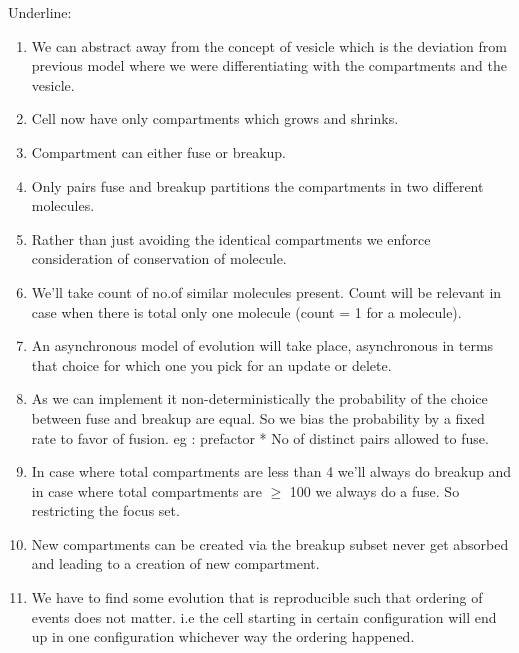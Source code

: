 \documentclass[preprint,12pt]{elsarticle}
\begin{document}
Underline:
\begin{enumerate}
\item We can abstract away from the concept of vesicle which is the  deviation from previous model where we were differentiating with the compartments and the vesicle.
\item Cell now have only compartments which grows and shrinks. 
\item Compartment can either fuse or breakup.
\item Only pairs fuse and breakup partitions the compartments in two different molecules.
\item Rather than just avoiding the identical compartments we enforce consideration of conservation of molecule.
\item We'll take count of no.of similar molecules present. Count will be relevant in case when there is total only one molecule (count = 1 for a molecule).
\item An asynchronous model of evolution will take place, asynchronous in terms that choice for which one you pick for an update or delete.
\item As we can implement it non-deterministically the probability of the choice between fuse and breakup are equal. So we bias the probability by a fixed rate to favor of fusion. eg : prefactor * No of distinct pairs allowed to fuse.
\item In case where total compartments are less than 4 we'll always do breakup and in case where total compartments are
   $\geq$ 100 we always do a fuse. So restricting the focus set. 
\item New compartments can be created via the breakup subset never get absorbed and leading to a creation of new compartment.
\item We have to find some evolution that is reproducible such that ordering of events does not matter. i.e the cell starting in certain configuration will end up in one configuration whichever way the ordering happened.
\end{enumerate}

\end{document}
